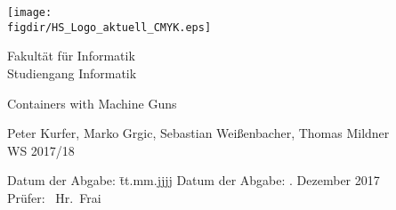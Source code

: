 \begin{titlepage}

\raggedleft

\vspace*{-2cm}

\texttt{[image: \\figdir/HS\_Logo\_aktuell\_CMYK.eps]}

\vfill

\centering
\LARGE
Fakultät für Informatik  \vspace{0.5cm}\\
\Large
Studiengang Informatik

\vspace{2cm}

\LARGE

Containers with Machine Guns
\vspace{2cm}

\Large
Peter Kurfer, Marko Grgic, Sebastian Weißenbacher, Thomas Mildner\\
WS 2017/18

\vspace{1.5cm}

\vspace{1cm}

\flushleft
 \Large
\vspace*{\fill}

\begin{tabbing}
Datum der Abgabe: \= tt.mm.jjjj \kill
Datum der Abgabe: . Dezember 2017 \\
Prüfer: \> \ Hr.\ Frai\\
\end{tabbing}

\end{titlepage}

\cleardoubleemptypage

